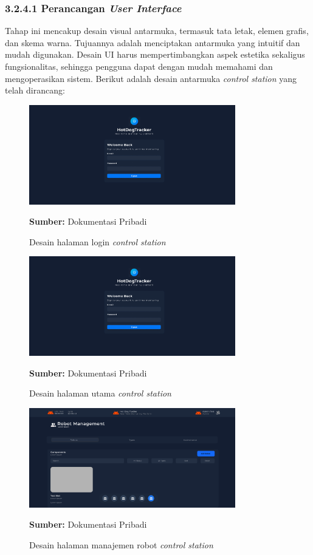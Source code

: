\subsubsection{3.2.4.1 Perancangan \emph{User Interface}}
 Tahap ini mencakup desain visual antarmuka, termasuk tata letak, elemen grafis, dan skema warna. Tujuannya adalah menciptakan antarmuka yang  intuitif dan mudah digunakan. Desain UI harus mempertimbangkan aspek estetika sekaligus fungsionalitas, sehingga pengguna dapat dengan mudah memahami dan mengoperasikan sistem. Berikut adalah desain antarmuka \emph{control station} yang telah dirancang:

\begin{figure}[H]
  \centering
  \includegraphics[width=0.8\textwidth]{gambar/bab3/auth-ui.png}
  \caption{Desain halaman login \emph{control station}}
  \label{fig:control-station-auth}
  \footnotesize{\textbf{Sumber:} Dokumentasi Pribadi}
\end{figure}


\begin{figure}[H]
  \centering
  \includegraphics[width=0.8\textwidth]{gambar/bab3/auth-ui.png}
  \caption{Desain halaman utama \emph{control station}}
  \label{fig:control-station-robot-main}
  \footnotesize{\textbf{Sumber:} Dokumentasi Pribadi}
\end{figure}

\begin{figure}[H]
  \centering
  \includegraphics[width=0.8\textwidth]{gambar/bab3/robot-ui.png}
  \caption{Desain halaman manajemen robot \emph{control station}}
  \label{fig:control-station-robot-robot}
  \footnotesize{\textbf{Sumber:} Dokumentasi Pribadi}
\end{figure}

